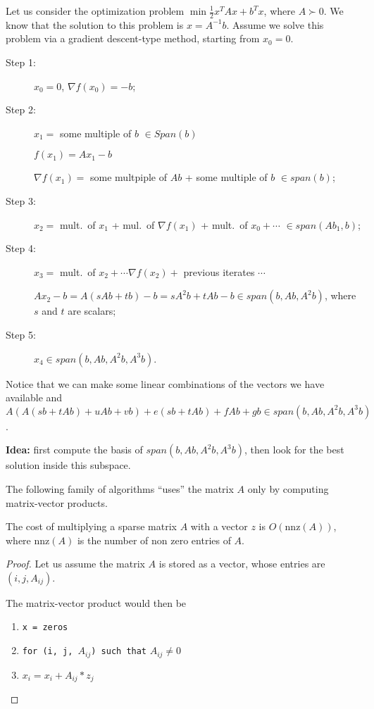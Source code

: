 \documentclass[ComputationalMathematics.tex]{subfiles}
\begin{document}
\begin{example}
  Let us consider the optimization problem $\min \frac{1}{2}x^T A x + b^T x $, where $A \succ 0$. We know that the solution to this problem is $x=A^{-1}b$. Assume we solve this problem via a gradient descent-type method, starting from $x_0=0$.
  \begin{description}
    \item[{\sc Step 1:}] $x_0 = 0$, $\nabla f(x_0) = -b$;
    \item[{\sc Step 2:}] $x_1 = $ some multiple of $b$ $\in Span(b)$
      
      $f(x_1) = Ax_1 - b$

      $\nabla f(x_1) = $ some multpiple of $Ab$ + some multiple of $b$ $\in span(b)$;
    \item[{\sc Step 3:}] $x_2 = $ mult.~of $x_1$ + mul.~of $\nabla f(x_1)$ + mult.~of $x_0 + \cdots $ $\in span(Ab_1, b)$;
    \item[{\sc Step 4:}] $x_3 = $ mult.~of $x_2 + \cdots \nabla f(x_2) + $ previous iterates $\cdots$

      $Ax_2 - b = A (sAb + tb) - b= s A^2 b + tAb -b \in span(b, Ab, A^2b)$, where $s$ and $t$ are scalars;
    \item[{\sc Step 5:}] $x_4 \in span(b, Ab, A^2b, A^3b)$.
  \end{description}
  Notice that we can make some linear combinations of the vectors we have available and $A(A(sb + tAb) +uAb + vb) + e(sb + tAb) + fAb+gb \in span(b, Ab, A^2b, A^3b)$.
\end{example}

  \textbf{Idea:} first compute the basis of $span(b, Ab, A^2b, A^3b)$, then look for the best solution inside this subspace.

The following family of algorithms ``uses'' the matrix $A$ only by computing matrix-vector products.

\begin{obs}
  The cost of multiplying a sparse matrix $A$ with a vector $z$ is $O(\text{nnz}(A))$, where $\text{nnz}(A)$ is the number of non zero entries of $A$.
\end{obs}

\begin{proof}
  Let us assume the matrix $A$ is stored as a vector, whose entries are $(i, j, A_{ij})$.

  The matrix-vector product would then be
  \begin{enumerate}
    \item \texttt{x = zeros}
    \item \texttt{for (i, j, }$A_{ij}$\texttt{) such that} $A_{ij} \neq 0$
    \item $x_i = x_i + A_{ij} * z_j$
  \end{enumerate}
\end{proof}
\end{document}

